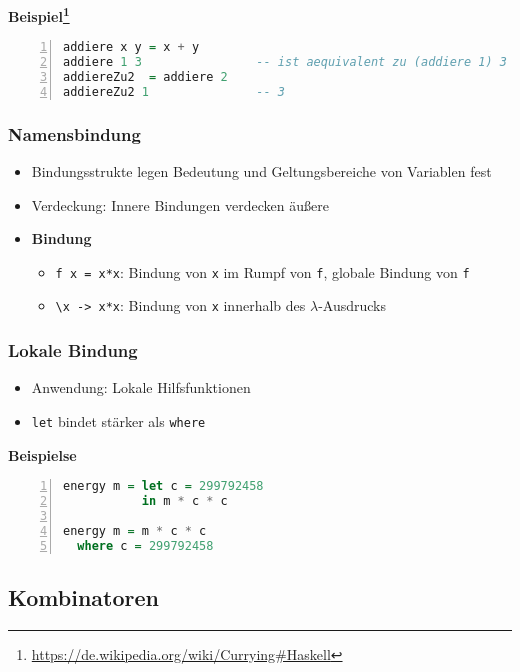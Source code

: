 \textbf{Beispiel\footnote{\url{https://de.wikipedia.org/wiki/Currying\#Haskell}}}

\begin{lstlisting}[frame=single,numbers=left,mathescape,language=Haskell]
addiere x y = x + y
addiere 1 3                -- ist aequivalent zu (addiere 1) 3
addiereZu2  = addiere 2
addiereZu2 1               -- 3
\end{lstlisting}

\subsubsection{Namensbindung}
\begin{itemize}
	\item Bindungsstrukte legen Bedeutung und Geltungsbereiche von Variablen fest
	\item Verdeckung: Innere Bindungen verdecken äußere
	\item \textbf{Bindung}
	\begin{itemize}
		\item \texttt{f x = x*x}: Bindung von \texttt{x} im Rumpf von \texttt{f}, globale Bindung von \texttt{f}
		\item \texttt{\textbackslash x -> x*x}: Bindung von \texttt{x} innerhalb des \(\lambda\)-Ausdrucks
	\end{itemize}
\end{itemize}

\subsubsection{Lokale Bindung}
\begin{itemize}
	\item Anwendung: Lokale Hilfsfunktionen
	\item \texttt{let} bindet stärker als \texttt{where}
\end{itemize}

\textbf{Beispielse}

\begin{lstlisting}[frame=single,numbers=left,mathescape,language=Haskell]
energy m = let c = 299792458
           in m * c * c

energy m = m * c * c
  where c = 299792458
\end{lstlisting}

\subsection{Kombinatoren}

